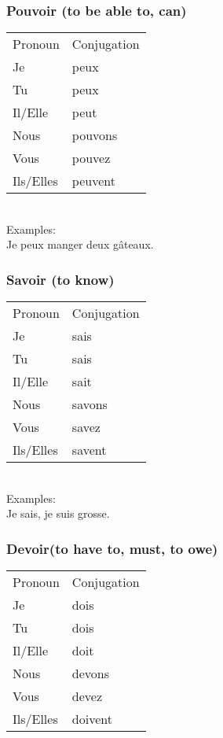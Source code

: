 \subsubsection{Pouvoir (to be able to, can)}
\begin{tabular}{| l | l |}
\hline
Pronoun 	& Conjugation	\\
Je		    & peux     \\
Tu		    & peux     \\
Il/Elle		& peut     \\
Nous		& pouvons     \\
Vous		& pouvez     \\
Ils/Elles	& peuvent     \\
\hline
\end{tabular}

\noindent \\Examples:\\
Je peux manger deux g\^ateaux.

\subsubsection{Savoir (to know)}
\begin{tabular}{| l | l |}
\hline
Pronoun 	& Conjugation	\\
Je		    &  sais \\
Tu		    &  sais \\
Il/Elle		&  sait \\
Nous		&  savons \\
Vous		&  savez  \\
Ils/Elles	&  savent \\
\hline
\end{tabular}

\noindent \\Examples:\\
Je sais, je suis grosse.

\subsubsection{Devoir(to have to, must, to owe)}
\begin{tabular}{| l | l |}
\hline
Pronoun 	& Conjugation	\\
Je		    &  dois \\
Tu		    &  dois \\
Il/Elle		&  doit \\
Nous		&  devons   \\
Vous		&  devez \\
Ils/Elles	&  doivent \\
\hline
\end{tabular}

